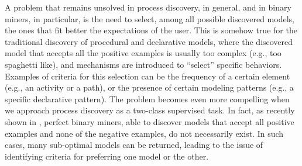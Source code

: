 A problem that remains unsolved in process discovery, in general, and in binary miners, in particular, is the need to select, among all possible discovered models, the ones that fit better the expectations of the user. This is somehow true for the traditional discovery of procedural and declarative models, where the discovered model that accepts all the positive examples is usually too complex (e.g., too spaghetti like), and mechanisms are introduced to ``select'' specific behaviors. Examples of criteria for this selection can be the frequency of a certain element (e.g., an activity or a path), or the presence of certain modeling patterns (e.g., a specific declarative pattern).   
The problem becomes even more compelling when we approach process discovery as a two-class supervised task. In fact, as recently shown in \cite{DBLP:conf/bpm/SlaatsDB21}, perfect binary miners, able to discover models that accept all positive examples and none of the negative examples, do not necessarily exist. In such cases, many sub-optimal models can be returned, leading to the issue of identifying criteria for preferring one model or the other.
 
